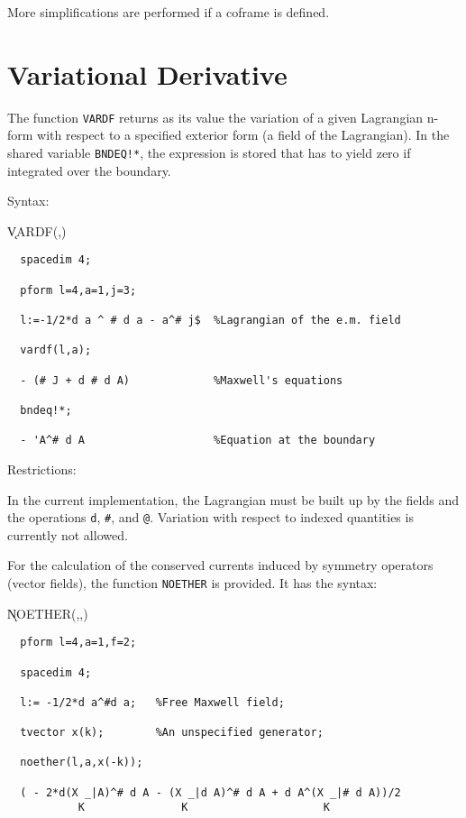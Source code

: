 More simplifications are performed if a coframe is defined.



\section{Variational Derivative}

 
The function {\tt VARDF}\label{VARDF} returns as its value the
variation of a given Lagrangian n-form with respect to a specified
exterior form (a field of the Lagrangian).  In the shared variable
{\tt BNDEQ!*}, the expression is stored that has to yield zero if
integrated over the boundary.

Syntax:

\hspace*{2em} \k{VARDF}(,)

\example{}

\begin{verbatim}
  spacedim 4;

  pform l=4,a=1,j=3;

  l:=-1/2*d a ^ # d a - a^# j$  %Lagrangian of the e.m. field

  vardf(l,a);

  - (# J + d # d A)             %Maxwell's equations

  bndeq!*;

  - 'A^# d A                    %Equation at the boundary
\end{verbatim}

Restrictions:

In the current implementation, the Lagrangian must be built up by the
fields and the operations {\tt d}, {\tt \#}, and {\tt @}. Variation
with respect to indexed quantities is currently not allowed.

For the calculation of the conserved currents induced by symmetry
operators (vector fields), the function {\tt NOETHER}\label{NOETHER}
is provided.  It has the syntax:

\hspace*{2em}
\k{NOETHER}(,,)

\example{}

\begin{verbatim}
  pform l=4,a=1,f=2;

  spacedim 4;

  l:= -1/2*d a^#d a;   %Free Maxwell field;

  tvector x(k);        %An unspecified generator;

  noether(l,a,x(-k));

  ( - 2*d(X _|A)^# d A - (X _|d A)^# d A + d A^(X _|# d A))/2
           K               K                     K
\end{verbatim}

